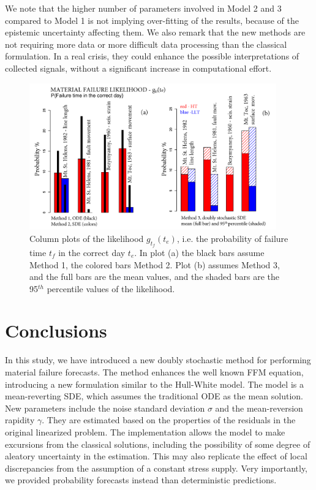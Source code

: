 \documentclass{article}
\begin{document}
We note that the higher number of parameters involved in Model 2 and 3 compared to Model 1 is not implying over-fitting of the results, because of the epistemic uncertainty affecting them. We also remark that the new methods are not requiring more data or more difficult data processing than the classical formulation. In a real crisis, they could enhance the possible interpretations of collected signals, without a significant increase in computational effort.

\begin{figure}[H]
\centering
\includegraphics[width=0.95\textwidth]{Fig15_plusX.png}
\caption{Column plots of the likelihood $g_{t_f}(t_e)$, i.e. the probability of failure time $t_f$ in the correct day $t_e$. In plot (a) the black bars assume Method 1, the colored bars Method 2. Plot (b) assumes Method 3, and the full bars are the mean values, and the shaded bars are the 95$^{th}$ percentile values of the likelihood.}
\label{Fig15}
\end{figure}

\section{Conclusions}\label{s7}
In this study, we have introduced a new doubly stochastic method for performing material failure forecasts. The method enhances the well known FFM equation, introducing a new formulation similar to the Hull-White model. The model is a mean-reverting SDE, which assumes the traditional ODE as the mean solution. New parameters include the noise standard deviation $\sigma$ and the mean-reversion rapidity $\gamma$. They are estimated based on the properties of the residuals in the original linearized problem. The implementation allows the model to make excursions from the classical solutions, including the possibility of some degree of aleatory uncertainty in the estimation. This may also replicate the effect of local discrepancies from the assumption of a constant stress supply. Very importantly, we provided probability forecasts instead than deterministic predictions.
\end{document}
